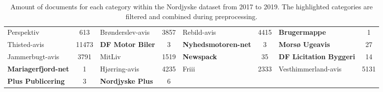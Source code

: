 \begin{table*}[h]
\begin{tabular}{l|c|l|c|l|c|l|c}
		Perspektiv                 &  613   & Brønderslev-avis        &  3857  & Rebild-avis                    &  4415  & \textbf{Brugermappe}           &   1    \\
		Thisted-avis               & 11473  & \textbf{DF Motor Biler} &   3    & \textbf{Nyhedsmotoren-net}     &   3    & \textbf{Morsø Ugeavis}         &   27   \\
		Jammerbugt-avis            &  3791  & MitLiv                  &  1519  & \textbf{Newspack}              &   35   & \textbf{DF Licitation Byggeri} &   14   \\
		\textbf{Mariagerfjord-net} &   1    & Hjørring-avis           &  4235  & Friii                          &  2333  & Vesthimmerland-avis            &  5131  \\
		\textbf{Plus Publicering}  &   3    & \textbf{Nordjyske Plus} &   6    &                                &        &                                &        \\ \bottomrule
	\end{tabular}
	\caption{Amount of documents for each category within the Nordjyske dataset from 2017 to 2019.
	The highlighted categories are filtered and combined during preprocessing.}
	\label{tab:category_table}
\end{table*}

